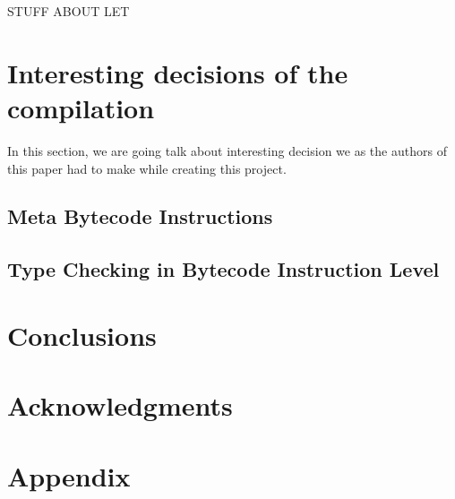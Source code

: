 \documentclass{acm_proc_article-sp}
\begin{document}
STUFF ABOUT LET

\section{Interesting decisions of the compilation}
In this section, we are going talk about interesting decision we as the authors of this paper had to make while creating this project.
\subsection{Meta Bytecode Instructions}

\subsection{Type Checking in Bytecode Instruction Level}

\section{Conclusions}

\section{Acknowledgments}

\section{Appendix}

\end{document}
